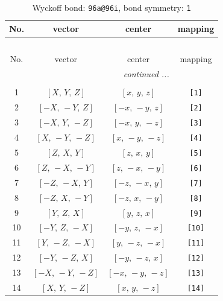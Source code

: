 \documentclass[fleqn,8pt]{jsarticle}
\begin{document}
\begin{longtable}{cccc}
\caption{Wyckoff bond: {\tt 96a@96i}, bond symmetry: {\tt 1}}
 \\
 \hline \hline
No. & vector & center & mapping \\ \hline \endfirsthead

\multicolumn{3}{l}{\tablename\ \thetable{}} \\
 \hline \hline
No. & vector & center & mapping \\ \hline \endhead

 \hline \hline
\multicolumn{3}{r}{\footnotesize\it continued ...} \\ \endfoot

 \hline \hline
\multicolumn{3}{r}{} \\ \endlastfoot

1 & $\left[ X,\, Y,\, Z \right]$ & $\left[ x,\, y,\, z \right]$ & {\tt [1]} \\ \hline
2 & $\left[ - X,\, - Y,\, Z \right]$ & $\left[ - x,\, - y,\, z \right]$ & {\tt [2]} \\ \hline
3 & $\left[ - X,\, Y,\, - Z \right]$ & $\left[ - x,\, y,\, - z \right]$ & {\tt [3]} \\ \hline
4 & $\left[ X,\, - Y,\, - Z \right]$ & $\left[ x,\, - y,\, - z \right]$ & {\tt [4]} \\ \hline
5 & $\left[ Z,\, X,\, Y \right]$ & $\left[ z,\, x,\, y \right]$ & {\tt [5]} \\ \hline
6 & $\left[ Z,\, - X,\, - Y \right]$ & $\left[ z,\, - x,\, - y \right]$ & {\tt [6]} \\ \hline
7 & $\left[ - Z,\, - X,\, Y \right]$ & $\left[ - z,\, - x,\, y \right]$ & {\tt [7]} \\ \hline
8 & $\left[ - Z,\, X,\, - Y \right]$ & $\left[ - z,\, x,\, - y \right]$ & {\tt [8]} \\ \hline
9 & $\left[ Y,\, Z,\, X \right]$ & $\left[ y,\, z,\, x \right]$ & {\tt [9]} \\ \hline
10 & $\left[ - Y,\, Z,\, - X \right]$ & $\left[ - y,\, z,\, - x \right]$ & {\tt [10]} \\ \hline
11 & $\left[ Y,\, - Z,\, - X \right]$ & $\left[ y,\, - z,\, - x \right]$ & {\tt [11]} \\ \hline
12 & $\left[ - Y,\, - Z,\, X \right]$ & $\left[ - y,\, - z,\, x \right]$ & {\tt [12]} \\ \hline
13 & $\left[ - X,\, - Y,\, - Z \right]$ & $\left[ - x,\, - y,\, - z \right]$ & {\tt [13]} \\ \hline
14 & $\left[ X,\, Y,\, - Z \right]$ & $\left[ x,\, y,\, - z \right]$ & {\tt [14]} \\ \hline

\end{longtable}
\end{document}
